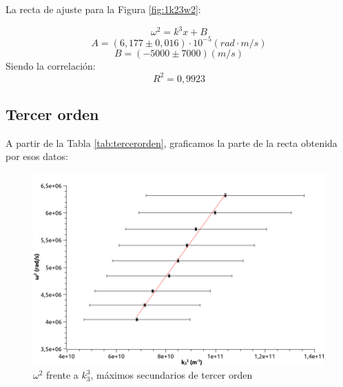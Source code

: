 \documentclass[a4paper,12pt,spanish]{article}
\begin{document}

	
	
	
	La recta de ajuste para la Figura \ref{fig:1k23w2}:
	
	\[ \omega^2 = k^3 x +B
	\]
	\[A = (6,177 \pm 0,016) \cdot 10^{-5} \si{(rad\cdot m/s)}%
	\]
	\[ B = (-5000\pm 7000)\si{(m/s)}    %
	\]
	Siendo la correlación:
	\[ R^2 =  0,9923
	\]
	
	\subsection*{Tercer orden}
	
	A partir de la Tabla \ref{tab:tercerorden}, graficamos la parte de la recta obtenida por esos datos:
	
\begin{figure}[H]
	\centering
	\includegraphics[width=0.9\linewidth]{../fotos/graficas/1_k33w2}
	\caption{}
	\label{fig:1k33w2}
	\caption{$\omega^2$ frente a $k_3^3$, máximos secundarios de tercer orden}
\end{figure}
	
\end{document}

